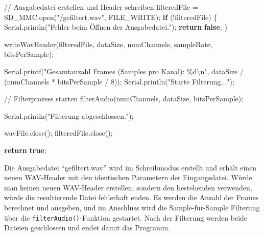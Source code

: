 \documentclass[
  ngerman,
  letterpaper,
  DIV=11]{scrreprt}
\newenvironment{Shaded}{\begin{snugshade}}{\end{snugshade}}
\newcommand{\CommentTok}[1]{\textcolor[rgb]{0.37,0.37,0.37}{#1}}
\newcommand{\ControlFlowTok}[1]{\textcolor[rgb]{0.00,0.23,0.31}{\textbf{#1}}}
\newcommand{\DecValTok}[1]{\textcolor[rgb]{0.68,0.00,0.00}{#1}}
\newcommand{\KeywordTok}[1]{\textcolor[rgb]{0.00,0.23,0.31}{\textbf{#1}}}
\newcommand{\NormalTok}[1]{\textcolor[rgb]{0.00,0.23,0.31}{#1}}
\newcommand{\OperatorTok}[1]{\textcolor[rgb]{0.37,0.37,0.37}{#1}}
\newcommand{\SpecialCharTok}[1]{\textcolor[rgb]{0.37,0.37,0.37}{#1}}
\newcommand{\StringTok}[1]{\textcolor[rgb]{0.13,0.47,0.30}{#1}}
\begin{document}
\begin{Shaded}
\begin{Highlighting}[]
\CommentTok{// Ausgabedatei erstellen und Header schreiben}
\NormalTok{filteredFile }\OperatorTok{=}\NormalTok{ SD\_MMC}\OperatorTok{.}\NormalTok{open}\OperatorTok{(}\StringTok{"/gefiltert.wav"}\OperatorTok{,}\NormalTok{ FILE\_WRITE}\OperatorTok{);}
\ControlFlowTok{if} \OperatorTok{(!}\NormalTok{filteredFile}\OperatorTok{)} \OperatorTok{\{}
\NormalTok{  Serial}\OperatorTok{.}\NormalTok{println}\OperatorTok{(}\StringTok{"Fehler beim Öffnen der Ausgabedatei."}\OperatorTok{);}
  \ControlFlowTok{return} \KeywordTok{false}\OperatorTok{;}
\OperatorTok{\}}

\NormalTok{writeWavHeader}\OperatorTok{(}\NormalTok{filteredFile}\OperatorTok{,}\NormalTok{ dataSize}\OperatorTok{,}\NormalTok{ numChannels}\OperatorTok{,}\NormalTok{ sampleRate}\OperatorTok{,}\NormalTok{ bitsPerSample}\OperatorTok{);}

\NormalTok{Serial}\OperatorTok{.}\NormalTok{printf}\OperatorTok{(}\StringTok{"Gesamtanzahl Frames (Samples pro Kanal): }\SpecialCharTok{\%d\textbackslash{}n}\StringTok{"}\OperatorTok{,} 
\NormalTok{              dataSize }\OperatorTok{/} \OperatorTok{(}\NormalTok{numChannels }\OperatorTok{*}\NormalTok{ bitsPerSample }\OperatorTok{/} \DecValTok{8}\OperatorTok{));}
\NormalTok{Serial}\OperatorTok{.}\NormalTok{println}\OperatorTok{(}\StringTok{"Starte Filterung..."}\OperatorTok{);}

\CommentTok{// Filterprozess starten}
\NormalTok{filterAudio}\OperatorTok{(}\NormalTok{numChannels}\OperatorTok{,}\NormalTok{ dataSize}\OperatorTok{,}\NormalTok{ bitsPerSample}\OperatorTok{);}

\NormalTok{Serial}\OperatorTok{.}\NormalTok{println}\OperatorTok{(}\StringTok{"Filterung abgeschlossen."}\OperatorTok{);}

\NormalTok{wavFile}\OperatorTok{.}\NormalTok{close}\OperatorTok{();}
\NormalTok{filteredFile}\OperatorTok{.}\NormalTok{close}\OperatorTok{();}

\ControlFlowTok{return} \KeywordTok{true}\OperatorTok{;}
\end{Highlighting}
\end{Shaded}

Die Ausgabedatei ``gefiltert.wav'' wird im Schreibmodus erstellt und
erhält einen neuen WAV-Header mit den identischen Parametern der
Eingangsdatei. Würde man keinen neuen WAV-Header erstellen, sondern den
bestehenden verwenden, würde die resultierende Datei fehlerhaft enden.
Es werden die Anzahl der Frames berechnet und ausgeben, und im Anschluss
wird die Sample-für-Sample Filterung über die
\texttt{filterAudio()}-Funktion gestartet. Nach der Filterung werden
beide Dateien geschlossen und endet damit das Programm.
\end{document}
